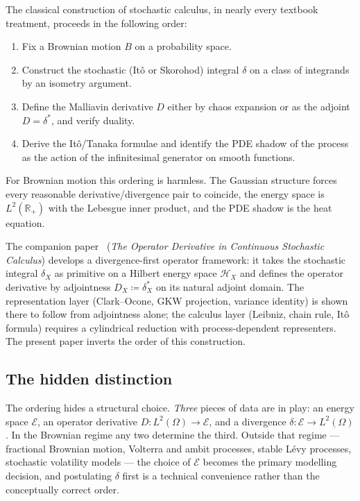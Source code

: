 \documentclass[11pt,reqno]{amsart}
\theoremstyle{plain}
\theoremstyle{definition}
\theoremstyle{remark}
\newcommand{\R}{\mathbb{R}}
\newcommand{\Energy}{\mathcal{E}}
\begin{document}
The classical construction of stochastic calculus, in nearly every textbook
treatment, proceeds in the following order:
\begin{enumerate}
\item Fix a Brownian motion $B$ on a probability space.
\item Construct the stochastic (It\^o or Skorohod) integral $\delta$ on
  a class of integrands by an isometry argument.
\item Define the Malliavin derivative $D$ either by chaos expansion or
  as the adjoint $D=\delta^{*}$, and verify duality.
\item Derive the It\^o/Tanaka formulae and identify the PDE shadow of
  the process as the action of the infinitesimal generator on smooth
  functions.
\end{enumerate}
For Brownian motion this ordering is harmless. The Gaussian structure
forces every reasonable derivative/divergence pair to coincide, the
energy space is $L^2(\R_+)$ with the Lebesgue inner product, and the
PDE shadow is the heat equation.

The companion paper~\cite{Fontes-OperatorDerivative} (\emph{The Operator
Derivative in Continuous Stochastic Calculus}) develops a divergence-first
operator framework: it takes the stochastic integral $\delta_X$ as primitive
on a Hilbert energy space $\mathcal H_X$ and defines the operator derivative
by adjointness $D_X\coloneqq\delta_X^{*}$ on its natural adjoint domain.
The representation layer (Clark--Ocone, GKW projection, variance identity)
is shown there to follow from adjointness alone; the calculus layer
(Leibniz, chain rule, It\^o formula) requires a cylindrical reduction with
process-dependent representers. The present paper inverts the order of
this construction.

\subsection*{The hidden distinction}
The ordering hides a structural choice. \emph{Three} pieces of data
are in play: an energy space $\Energy$, an operator derivative
$D\colon L^2(\Omega)\to\Energy$, and a divergence
$\delta\colon\Energy\to L^2(\Omega)$. In the Brownian regime any two
determine the third. Outside that regime --- fractional Brownian
motion, Volterra and ambit processes, stable L\'evy processes,
stochastic volatility models --- the choice of $\Energy$ becomes the
primary modelling decision, and postulating $\delta$ first is a
technical convenience rather than the conceptually correct order.
\end{document}
